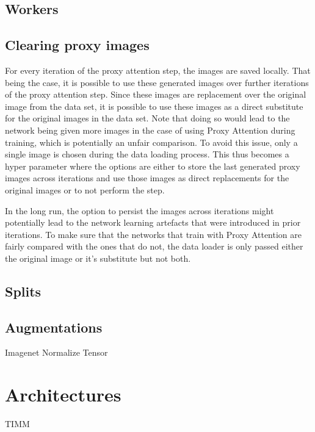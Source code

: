 \subsection{Workers}

\subsection{Clearing proxy images} \label{sec:clearing_proxy_images}
For every iteration of the proxy attention step, the images are saved locally. That being the case, it is possible to use these generated images over further iterations of the proxy attention step. Since these images are replacement over the original image from the data set, it is possible to use these images as a direct substitute for the original images in the data set. Note that doing so would lead to the network being given more images in the case of using Proxy Attention during training, which is potentially an unfair comparison. To avoid this issue, only a single image is chosen during the data loading process. This thus becomes a hyper parameter where the options are either to store the last generated proxy images across iterations and use those images as direct replacements for the original images or to not perform the step. 

In the long run, the option to persist the images across iterations might potentially lead to the network learning artefacts that were introduced in prior iterations. To make sure that the networks that train with Proxy Attention are fairly compared with the ones that do not, the data loader is only passed either the original image or it's substitute but not both. 

\subsection{Splits}

\subsection{Augmentations}
Imagenet Normalize
Tensor

\section{Architectures}
TIMM

